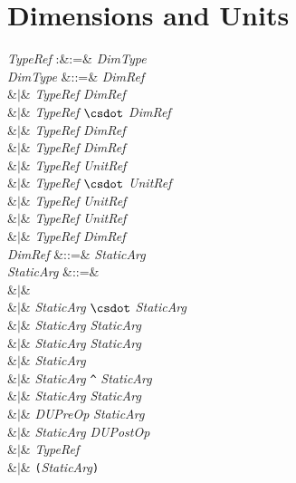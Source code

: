 %
%
%
%

\chapter{Dimensions and Units}



\begin{Grammar}
\emph{TypeRef} :&:=& \emph{DimType}\\

\emph{DimType} &::=& \emph{DimRef} \\
&$|$& \emph{TypeRef} \emph{DimRef}\\
&$|$& \emph{TypeRef} $\csdot$ \emph{DimRef} \\
&$|$& \emph{TypeRef} \EXP{/} \emph{DimRef}\\
&$|$& \emph{TypeRef}  \emph{DimRef}\\
&$|$& \emph{TypeRef} \emph{UnitRef}\\
&$|$& \emph{TypeRef} $\csdot$ \emph{UnitRef} \\
&$|$& \emph{TypeRef} \EXP{/} \emph{UnitRef}\\
&$|$& \emph{TypeRef}  \emph{UnitRef}\\
&$|$& \emph{TypeRef}  \emph{DimRef}\\

\emph{DimRef} &::=& \emph{StaticArg} \\

\emph{StaticArg} &::=&  \\
&$|$& \\
&$|$& \emph{StaticArg} $\csdot$ \emph{StaticArg} \\
&$|$& \emph{StaticArg} \emph{StaticArg} \\
&$|$& \emph{StaticArg} \EXP{/} \emph{StaticArg}\\
&$|$& \EXP{/}\emph{StaticArg}\\
&$|$& \emph{StaticArg} \texttt{\^} \emph{StaticArg}\\
&$|$& \emph{StaticArg}  \emph{StaticArg}\\
&$|$& \emph{DUPreOp} \emph{StaticArg}\\
&$|$& \emph{StaticArg} \emph{DUPostOp}\\
&$|$& \emph{TypeRef} \\
&$|$& \texttt{(}\emph{StaticArg}\texttt{)} \\


\end{Grammar}
